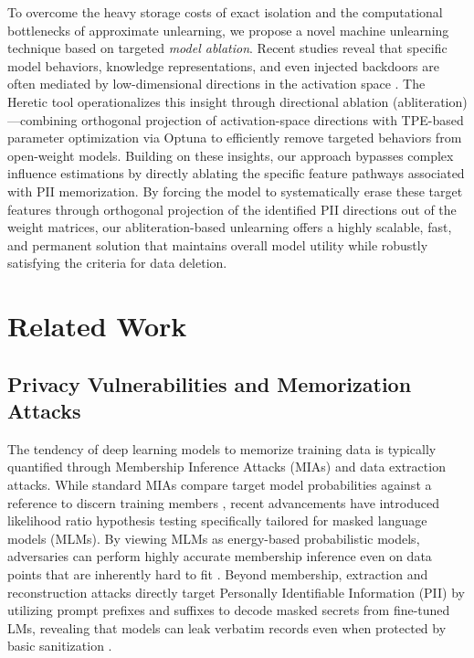 \documentclass[11pt]{article}
\begin{document}
To overcome the heavy storage costs of exact isolation and the computational bottlenecks of approximate unlearning, we propose a novel machine unlearning technique based on targeted \textit{model ablation}. Recent studies reveal that specific model behaviors, knowledge representations, and even injected backdoors are often mediated by low-dimensional directions in the activation space \citep{zhao2024facilitating, agnihotri2025granular}. The Heretic tool \citep{heretic2025} operationalizes this insight through directional ablation (abliteration)---combining orthogonal projection of activation-space directions with TPE-based parameter optimization via Optuna to efficiently remove targeted behaviors from open-weight models. Building on these insights, our approach bypasses complex influence estimations by directly ablating the specific feature pathways associated with PII memorization. By forcing the model to systematically erase these target features through orthogonal projection of the identified PII directions out of the weight matrices, our abliteration-based unlearning offers a highly scalable, fast, and permanent solution that maintains overall model utility while robustly satisfying the criteria for data deletion.

\section{Related Work}

\subsection{Privacy Vulnerabilities and Memorization Attacks}

The tendency of deep learning models to memorize training data is typically quantified through Membership Inference Attacks (MIAs) and data extraction attacks. While standard MIAs compare target model probabilities against a reference to discern training members \citep{shokri2017membership}, recent advancements have introduced likelihood ratio hypothesis testing specifically tailored for masked language models (MLMs). By viewing MLMs as energy-based probabilistic models, adversaries can perform highly accurate membership inference even on data points that are inherently hard to fit \citep{mireshghallah2022quantifying}. Beyond membership, extraction and reconstruction attacks directly target Personally Identifiable Information (PII) by utilizing prompt prefixes and suffixes to decode masked secrets from fine-tuned LMs, revealing that models can leak verbatim records even when protected by basic sanitization \citep{lukas2023analyzing}.
\end{document}
